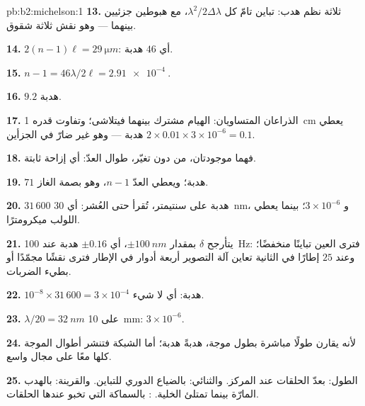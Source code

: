 \begin{solution}{pb:b2:michelson:1}
\textbf{13.} ثلاثة نظم هدب: تباين تامّ كل $\lambda^2/2\Delta\lambda$، مع
هبوطين جزئيين بينهما --- وهو نقش ثلاثة شقوق.

\textbf{14.} $2(n - 1)\ell = \qty{29}{\micro m}$: أي $46$ هدبة.

\textbf{15.} $n - 1 = 46\lambda/2\ell = \qty{2.91e-4}{}$.

\textbf{16.} $9.2$ هدبة.

\textbf{17.} الذراعان المتساويان: الهيام مشترك بينهما فيتلاشى؛ وتفاوت
قدره \qty{1}{cm} يعطي $2 \times 0.01 \times 3 \times 10^{-6} = 0.1$ هدبة ---
وهو غير ضارّ في الجزأين.

\textbf{18.} فهما موجودتان، من دون تغيّر، طوال العدّ: أي
إزاحة ثابتة.

\textbf{19.} $71$ هدبة؛ ويعطي العدّ $n - 1$، وهو بصمة الغاز.

\textbf{20.} $31\,600$ هدبة على سنتيمتر، تُقرأ حتى العُشر:
أي \qty{30}{nm}، و $3 \times 10^{-6}$؛ بينما يعطي اللولب ميكرومترًا.

\textbf{21.} يتأرجح $\delta$ بمقدار $\pm\qty{100}{nm}$، أي $\pm0.16$ هدبة عند \qty{100}{Hz}:
فترى العين تباينًا منخفضًا؛ وعند $25$ إطارًا في الثانية تعاين آلة التصوير
أربعة أدوار في الإطار فترى نقشًا مجمّدًا أو بطيء
الضربات.

\textbf{22.} $10^{-8} \times 31\,600 = 3 \times 10^{-4}$ هدبة: أي لا شيء.

\textbf{23.} $\lambda/20 = \qty{32}{nm}$ على \qty{10}{mm}: $3 \times 10^{-6}$.

\textbf{24.} لأنه يقارن طولًا مباشرة بطول موجة، هدبةً
هدبة؛ أما الشبكة فتنشر أطوال الموجة كلها معًا على مجال واسع.

\textbf{25.} الطول: بعدّ الحلقات عند المركز. والثنائي: بالضياع
الدوري للتباين. والقرينة: بالهدب المارّة بينما تمتلئ
الخلية. : بالسماكة التي تخبو عندها الحلقات.
\end{solution}
